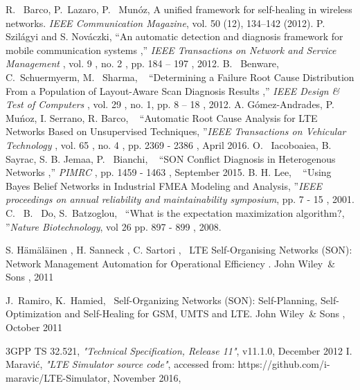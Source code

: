 \documentclass[conference]{IEEEtran}
\begin{document}
%
%
%
\begin{thebibliography}{11}
 R.~ Barco, P.~Lazaro, P.~ Mun\'oz, A unified framework for self-healing in wireless
networks. \emph{IEEE Communication Magazine}, vol. 50 (12), 134–142 (2012).
P.~ Szil\'agyi and S. Nov\'aczki, “An automatic detection and diagnosis framework for mobile communication systems ,”\emph{ IEEE Transactions on Network and Service Management} , vol. 9 , no. 2 , pp. 184 – 197 ,  2012.
B.~ Benware, C.~Schuermyerm, M.~ Sharma, ~ “Determining a Failure Root Cause Distribution From a Population of Layout-Aware Scan Diagnosis Results ,”\emph{ IEEE Design \& Test of Computers} , vol. 29 , no. 1,  pp. 8 – 18 , 2012.
A. G\'omez-Andrades, P. Mu\'noz, I. Serrano, R. Barco, ~ “Automatic Root Cause Analysis for LTE Networks
Based on Unsupervised Techniques, ”\emph{IEEE Transactions on Vehicular Technology} , vol. 65 , no. 4 , pp. 2369 - 2386 , April 2016.
O.~ Iacoboaiea, B.~ Sayrac, S. B. Jemaa, P.~ Bianchi, ~ “SON Conflict Diagnosis in Heterogenous Networks ,”\emph{ PIMRC} ,  pp. 1459 - 1463 , September 2015.
B. H. Lee, ~ “Using Bayes Belief Networks in Industrial FMEA Modeling and Analysis, ”\emph{IEEE proceedings on annual reliability and maintainability symposium}, pp. 7 - 15 ,  2001.
C.~ B.~ Do, S.~Batzoglou,~ “What is the expectation maximization algorithm?, ”\emph{Nature Biotechnology}, vol 26 pp. 897 - 899 ,  2008.

S. H\"am\"al\"ainen , H. Sanneck , C. Sartori ,~ LTE Self-Organising Networks (SON): Network Management Automation for Operational Efficiency . John Wiley~\& Sons , 2011

J.~Ramiro, K.~Hamied,~ Self-Organizing Networks (SON): Self-Planning, Self-Optimization and Self-Healing for GSM, UMTS and LTE. John Wiley~\& Sons , October 2011

3GPP TS 32.521, \emph{"Technical Specification, Release 11"},
v11.1.0, December 2012 
I. Maravi\'c, \emph{"LTE Simulator source code"}, accessed
from: https://github.com/i-maravic/LTE-Simulator, November 2016, 

\end{thebibliography}
\end{document}
